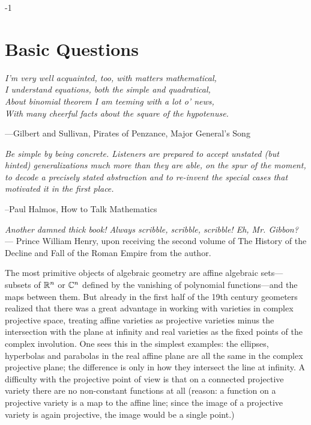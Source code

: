 

\setcounter{chapter} {-1}
\chapter{Basic Questions}

\begin{center}
\emph{I'm very well acquainted, too, with matters mathematical,\\
I understand equations, both the simple and quadratical,\\
About binomial theorem I am teeming with a lot o' news,\\
With many cheerful facts about the square of the hypotenuse.}

---Gilbert and Sullivan, Pirates of Penzance, Major General's Song


\emph{Be simple by being concrete. Listeners are prepared to
accept unstated (but hinted) generalizations much more than they are able, on the spur of the moment, to
decode a precisely stated abstraction and to re-invent the special cases that motivated it in the first place. }

--Paul Halmos, How to Talk Mathematics

\emph{Another damned thick book! Always scribble, scribble, scribble! Eh, Mr. Gibbon?} --- \scriptsize{Prince William Henry, upon receiving the second  volume of The History of the Decline and Fall of the Roman Empire from the author.}
\end{center}


The most primitive objects of algebraic geometry are affine algebraic sets---subsets of ${\mathbb R}^{n}$ or ${\mathbb C}^{n}$ defined by the vanishing of polynomial functions---and the maps between them. But already in the first half of the 19th century geometers realized that there was a great advantage in working with varieties in complex projective space, treating affine varieties as projective varieties minus the intersection with the plane at infinity and real varieties as the fixed points of the complex involution. One sees this in the simplest examples: the ellipses, hyperbolas and parabolas in the real affine plane are all the same in the complex projective plane; the difference is only in how they intersect the line at infinity. A difficulty with the projective point of view is that on a connected projective variety there are no non-constant functions at all (reason: a function on a projective variety is a map to the affine line; since the image of a projective variety is again projective, the image would be a single point.) 

